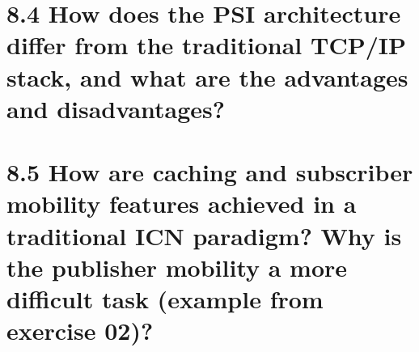 \documentclass{article}
\begin{document}
	\section*{8.4 How does the PSI architecture differ from the traditional TCP/IP stack, and what are the advantages and disadvantages?}
	\begin{adjustwidth}{2em}{2em}
	\end{adjustwidth}
	
	\section*{8.5 How are caching and subscriber mobility features achieved in a traditional ICN paradigm? Why is the publisher mobility a more difficult task (example from exercise 02)?}
	\begin{adjustwidth}{2em}{2em}
	\end{adjustwidth}
\end{document}
